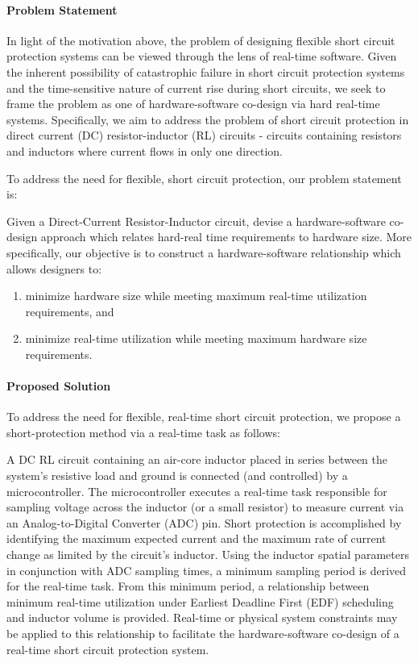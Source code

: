 \paragraph{Problem Statement}
In light of the motivation above, the problem of designing flexible short circuit protection systems can be viewed through the lens of real-time software.
Given the inherent possibility of catastrophic failure in short circuit protection systems and the time-sensitive nature of current rise during short circuits, we seek to frame the problem as one of hardware-software co-design via hard real-time systems.
Specifically, we aim to address the problem of short circuit protection in direct current (DC) resistor-inductor (RL) circuits - circuits containing resistors and inductors where current flows in only one direction.

To address the need for flexible, short circuit protection, our problem statement is:

\noindent Given a Direct-Current Resistor-Inductor circuit, devise a hardware-software co-design approach which relates hard-real time requirements to hardware size.
More specifically, our objective is to construct a hardware-software relationship which allows designers to:
\begin{enumerate}
    \item minimize hardware size while meeting maximum real-time utilization requirements, and
    \item minimize real-time utilization while meeting maximum hardware size requirements.
\end{enumerate}

\paragraph{Proposed Solution}
To address the need for flexible, real-time short circuit protection, we propose a short-protection method via a real-time task as follows:

A DC RL circuit containing an air-core inductor placed in series between the system's resistive load and ground is connected (and controlled) by a microcontroller.
The microcontroller executes a real-time task responsible for sampling voltage across the inductor (or a small resistor) to measure current via an Analog-to-Digital Converter (ADC) pin.
Short protection is accomplished by identifying the maximum expected current and the maximum rate of current change as limited by the circuit's inductor.
Using the inductor spatial parameters in conjunction with ADC sampling times, a minimum sampling period is derived for the real-time task.
From this minimum period, a relationship between minimum real-time utilization under Earliest Deadline First (EDF) scheduling and inductor volume is provided.
Real-time or physical system constraints may be applied to this relationship to facilitate the hardware-software co-design of a real-time short circuit protection system.

